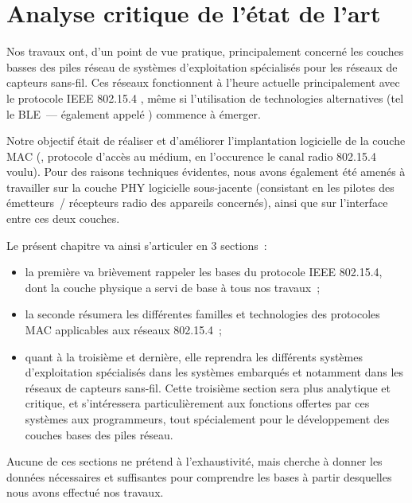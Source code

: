 
\chapter{Analyse critique de l'état de l'art}
\label{ChEtatArt}

Nos travaux ont, d'un point de vue pratique, principalement concerné les
couches basses des piles réseau de systèmes d'exploitation spécialisés
pour les réseaux de capteurs sans-fil. Ces réseaux fonctionnent à l'heure
actuelle principalement avec le protocole IEEE 802.15.4
\cite{IEEE802154-2011}, même si l'utilisation de technologies alternatives
(tel le BLE~---  également appelé
) commence à émerger.

Notre objectif était de réaliser et d'améliorer l'implantation logicielle
de la couche MAC (, protocole d'accès au médium,
en l'occurence le canal radio 802.15.4 voulu). Pour des raisons techniques
évidentes, nous avons également été amenés à travailler sur la couche PHY
logicielle sous-jacente (consistant en les pilotes des émetteurs~/
récepteurs radio des appareils concernés), ainsi que sur l'interface
entre ces deux couches.

Le présent chapitre va ainsi s'articuler en 3 sections~:
\begin{itemize}
\item la première va brièvement rappeler les bases du protocole IEEE 802.15.4,
dont la couche physique a servi de base à tous nos travaux~;
\item la seconde résumera les différentes familles et technologies des
protocoles MAC applicables aux réseaux 802.15.4~;
\item quant à la troisième et dernière, elle reprendra les différents
systèmes d'exploitation spécialisés dans les systèmes embarqués et notamment
dans les réseaux de capteurs sans-fil. Cette troisième section sera plus
analytique et critique, et s'intéressera particulièrement aux fonctions
offertes par ces systèmes aux programmeurs, tout spécialement pour le
développement des couches bases des piles réseau.
\end{itemize}

Aucune de ces sections ne prétend à l'exhaustivité, mais cherche à donner
les données nécessaires et suffisantes pour comprendre les bases à partir
desquelles nous avons effectué nos travaux.

